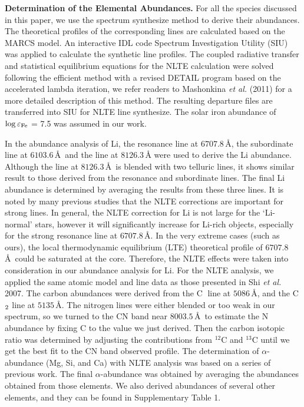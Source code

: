 \documentclass[twoside,onecolumnm,12pt]{article}
\newcommand{\upcite}[1]{\textsuperscript{\textsuperscript{\cite{#1}}}}
\newcommand{\eps}[1]{$\log\varepsilon_{\rm #1}$}
\newcommand\ion[2]{#1$\;${\scriptsize\rmfamily\uppercase\expandafter{\romannumeral#2}}\relax}
\begin{document}
\vspace{10pt}
\noindent\textbf{Determination of the Elemental Abundances.} For all the species discussed in this paper, we use the spectrum synthesize method to derive their abundances. The theoretical profiles of the corresponding lines are calculated based on the MARCS model\upcite{Gustafsson2008}. An interactive IDL code Spectrum Investigation Utility (SIU) was applied to calculate the synthetic line profiles. The coupled radiative transfer and statistical equilibrium equations for the NLTE calculation were solved following the efficient method with a revised DETAIL program based on the accelerated lambda iteration, we refer readers to Mashonkina \emph{et al.} (2011) for a more detailed description of this method\upcite{Mashonkina2011}. The resulting departure files are transferred into SIU for NLTE line synthesize. The solar iron abundance of \eps{Fe} = 7.5 was assumed in our work.

In the abundance analysis of Li, the resonance line at $6707.8$\,\AA, the subordinate line at $6103.6$\,\AA\, and the line at $8126.3$\,\AA\upcite{Adamow2015} were used to derive the Li abundance. Although the line at $8126.3$\,\AA\ is blended with two telluric lines, it shows similar result to those derived from the resonance and subordinate lines. The final Li abundance is determined by averaging the results from these three lines. 
It is noted by many previous studies that the NLTE corrections are important for strong lines. In general, the NLTE correction for Li is not large for the `Li-normal' stars, however it will significantly increase for Li-rich objects, especially for the strong resonance line at $6707.8$\,\AA. In the very extreme cases (such as ours), the local thermodynamic equilibrium (LTE) theoretical profile of $6707.8$\,\AA\ could be saturated at the core. Therefore, the NLTE effects were taken into consideration in our abundance analysis for Li. 
For the NLTE analysis, we applied the same atomic model and line data as those presented in Shi \emph{et al.} 2007\upcite{Shi2007}. The carbon abundances were derived from the \ion{C}{1} line at $5086$\,\AA, and the C$_{\rm 2}$ line at $5135$\,\AA\upcite{Alexeeva2015}. The nitrogen lines were either blended or too weak in our spectrum, so we turned to the CN band near $8003.5$\,\AA\ to estimate the N abundance by fixing C to the value we just derived. Then the carbon isotopic ratio was determined by adjusting the contributions from $^{12}$C and $^{13}$C until we get the best fit to the CN band observed profile. The determination of $\alpha$-abundance (Mg, Si, and Ca) with NLTE analysis was based on a series of previous work\upcite{Mashonkina2013, Zhang2016, Mashonkina2007}. The final $\alpha$-abundance was obtained by averaging the abundances obtained from those elements. We also derived abundances of several other elements, and they can be found in Supplementary Table 1.
\end{document}
